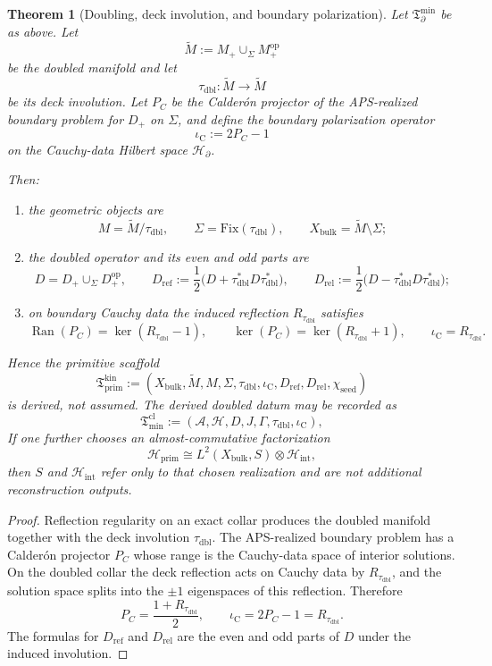 \documentclass[11pt,a4paper]{article}
\newtheorem{theorem}{Theorem}[section]
\theoremstyle{definition}
\theoremstyle{remark}
\newcommand{\Seam}{\Sigma}
\newcommand{\taudbl}{\tau_{\mathrm{dbl}}}
\newcommand{\iC}{\iota_{\mathrm C}}
\newcommand{\Xbulk}{X_{\mathrm{bulk}}}
\newcommand{\Hint}{\mathcal H_{\mathrm{int}}}
\newcommand{\Tmin}{\mathfrak T_{\mathrm{min}}}
\newcommand{\Tbound}{\mathfrak T_{\partial}^{\min}}
\newcommand{\Tprim}{\mathfrak T_{\mathrm{prim}}}
\newcommand{\chiseed}{\chi_{\mathrm{seed}}}
\begin{document}
\begin{theorem}[Doubling, deck involution, and boundary polarization]
\label{thm:primitive-datum-from-reduced-datum}
\label{thm:primitive-scaffold-from-reduced-datum}
Let $\Tbound$ be as above. Let
\[
\widetilde M:=M_+\cup_{\Sigma} M_+^{\mathrm{op}}
\]
be the doubled manifold and let
\[
\taudbl:\widetilde M\to\widetilde M
\]
be its deck involution. Let $P_C$ be the Calder\'on projector of the APS-realized boundary problem
for $D_+$ on $\Sigma$, and define the boundary polarization operator
\[
\iC:=2P_C-1
\]
on the Cauchy-data Hilbert space $\mathcal H_{\partial}$.

Then:
\begin{enumerate}[label=(\roman*), leftmargin=1.8em, topsep=3pt, itemsep=2pt]
    \item the geometric objects are
    \[
    M=\widetilde M/\taudbl,
    \qquad
    \Seam=\mathrm{Fix}(\taudbl),
    \qquad
    \Xbulk=\widetilde M\setminus\Seam;
    \]
    \item the doubled operator and its even and odd parts are
    \[
    D=D_+\cup_{\Sigma}D_+^{\mathrm{op}},
    \qquad
    D_{\mathrm{ref}}:=\frac12\bigl(D+\taudbl^{\ast}D\taudbl^{\ast}\bigr),
    \qquad
    D_{\mathrm{rel}}:=\frac12\bigl(D-\taudbl^{\ast}D\taudbl^{\ast}\bigr);
    \]
    \item on boundary Cauchy data the induced reflection $R_{\taudbl}$ satisfies
    \[
    \operatorname{Ran}(P_C)=\ker(R_{\taudbl}-1),
    \qquad
    \ker(P_C)=\ker(R_{\taudbl}+1),
    \qquad
    \iC=R_{\taudbl}.
    \]
\end{enumerate}
Hence the primitive scaffold
\[
\Tprim^{\mathrm{kin}}
:=
(\Xbulk,\widetilde M,M,\Seam,\taudbl,\iC,D_{\mathrm{ref}},D_{\mathrm{rel}},\chiseed)
\]
is derived, not assumed. The derived doubled datum may be recorded as
\[
\Tmin^{\mathrm{cl}}:=(\mathcal A,\mathcal H,D,J,\Gamma,\taudbl,\iC),
\]
If one further chooses an almost-commutative factorization
\[
\mathcal H_{\mathrm{prim}}\cong L^2(\Xbulk,S)\otimes \Hint,
\]
then $S$ and $\Hint$ refer only to that chosen realization and are not additional
reconstruction outputs.
\end{theorem}

\begin{proof}
Reflection regularity on an exact collar produces the doubled manifold together with the deck
involution $\taudbl$. The APS-realized boundary problem has a Calder\'on projector $P_C$ whose
range is the Cauchy-data space of interior solutions. On the doubled collar the deck reflection
acts on Cauchy data by $R_{\taudbl}$, and the solution space splits into the $\pm1$ eigenspaces of
this reflection. Therefore
\[
P_C=\frac{1+R_{\taudbl}}{2},
\qquad
\iC=2P_C-1=R_{\taudbl}.
\]
The formulas for $D_{\mathrm{ref}}$ and $D_{\mathrm{rel}}$ are the even and odd parts of $D$ under
the induced involution.
\end{proof}
\end{document}
